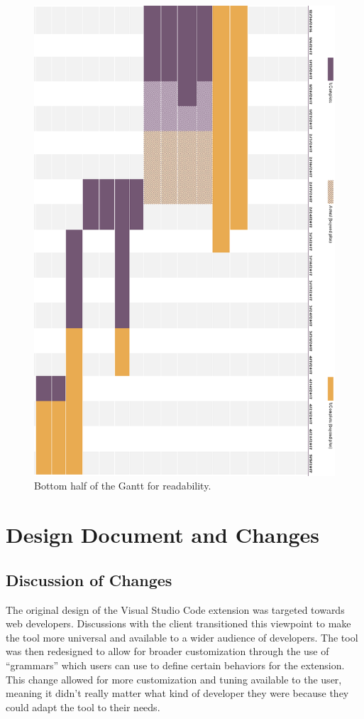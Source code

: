 \documentclass[letterpaper,10pt,titlepage,draftclsnofoot,onecolumn,onesided] {IEEEtran}
\begin{document}
\begin{figure}[H]
	\centering
	\includegraphics[width=.75\textwidth]{GanttBottom}
	\caption{Bottom half of the Gantt for readability.}
\end{figure}

\section{Design Document and Changes}

\subsection{Discussion of Changes}
The original design of the Visual Studio Code extension was targeted towards web developers.
Discussions with the client transitioned this viewpoint to make the tool more universal and available to a wider audience of developers.
The tool was then redesigned to allow for broader customization through the use of ``grammars'' which users can use to define certain behaviors for the extension.
This change allowed for more customization and tuning available to the user, meaning it didn't really matter what kind of developer they were because they could adapt the tool to their needs.\\
\end{document}
